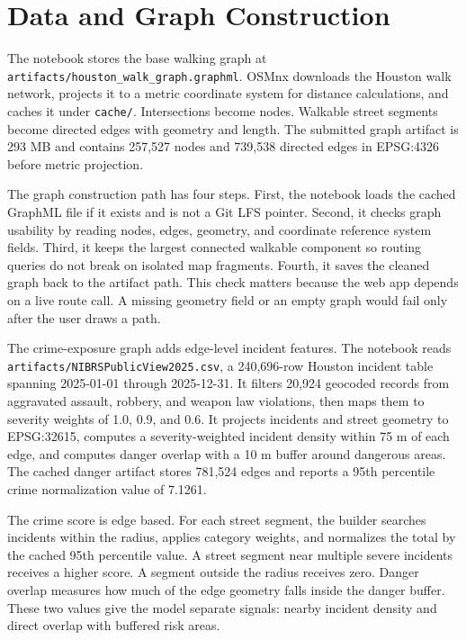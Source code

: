 \documentclass{article}
\begin{document}
\section{Data and Graph Construction}

The notebook stores the base walking graph at \texttt{artifacts/houston\_walk\_graph.graphml}. OSMnx downloads the Houston walk network, projects it to a metric coordinate system for distance calculations, and caches it under \texttt{cache/}. Intersections become nodes. Walkable street segments become directed edges with geometry and length. The submitted graph artifact is 293 MB and contains 257,527 nodes and 739,538 directed edges in EPSG:4326 before metric projection.

The graph construction path has four steps. First, the notebook loads the cached GraphML file if it exists and is not a Git LFS pointer. Second, it checks graph usability by reading nodes, edges, geometry, and coordinate reference system fields. Third, it keeps the largest connected walkable component so routing queries do not break on isolated map fragments. Fourth, it saves the cleaned graph back to the artifact path. This check matters because the web app depends on a live route call. A missing geometry field or an empty graph would fail only after the user draws a path.

The crime-exposure graph adds edge-level incident features. The notebook reads \texttt{artifacts/NIBRSPublicView2025.csv}, a 240,696-row Houston incident table spanning 2025-01-01 through 2025-12-31. It filters 20,924 geocoded records from aggravated assault, robbery, and weapon law violations, then maps them to severity weights of 1.0, 0.9, and 0.6. It projects incidents and street geometry to EPSG:32615, computes a severity-weighted incident density within 75 m of each edge, and computes danger overlap with a 10 m buffer around dangerous areas. The cached danger artifact stores 781,524 edges and reports a 95th percentile crime normalization value of 7.1261.

The crime score is edge based. For each street segment, the builder searches incidents within the radius, applies category weights, and normalizes the total by the cached 95th percentile value. A street segment near multiple severe incidents receives a higher score. A segment outside the radius receives zero. Danger overlap measures how much of the edge geometry falls inside the danger buffer. These two values give the model separate signals: nearby incident density and direct overlap with buffered risk areas.
\end{document}
